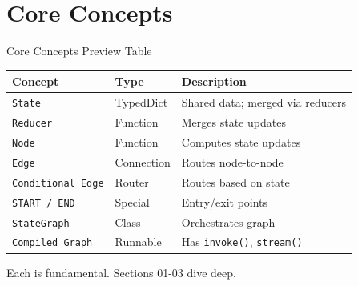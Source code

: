 \documentclass[aspectratio=169,11pt]{beamer}
\begin{document}
\section{Core Concepts}
\begin{frame}[t,shrink=3]{Core Concepts Preview Table}
\vspace{0.05cm}

\begin{tabular}{p{2.5cm}p{2.8cm}p{5.2cm}}
\toprule
\textbf{Concept} & \textbf{Type} & \textbf{Description} \\
\midrule
\texttt{State} & TypedDict & Shared data; merged via reducers \\
\texttt{Reducer} & Function & Merges state updates \\
\texttt{Node} & Function & Computes state updates \\
\texttt{Edge} & Connection & Routes node-to-node \\
\texttt{Conditional Edge} & Router & Routes based on state \\
\texttt{START / END} & Special & Entry/exit points \\
\texttt{StateGraph} & Class & Orchestrates graph \\
\texttt{Compiled Graph} & Runnable & Has \texttt{invoke()}, \texttt{stream()} \\
\bottomrule
\end{tabular}

\vspace{0.1cm}

{\scriptsize Each is fundamental. Sections 01-03 dive deep.}
\end{frame}
\end{document}

